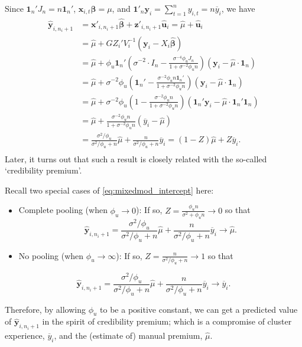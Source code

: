 \documentclass[ignorenonframetext,]{beamer}
\begin{document}
\begin{frame}[allowframebreaks]
\framebreak
Since $ \bm{1}_{n} ' J_n =n \bm{1}_n'$, $\mathbf{x}_{i,t}\bm{\beta}=\mu$, and $\bm{1}'_n \bm{y}_i = \sum_{t=1}^n y_{i,t}= n \overline{y}_i$, we have
$$
\begin{aligned}
\hat{\bm{y}}_{i,n_i+1} &= \bm{x}'_{i,n_i+1}\hat{\bm{\beta}} + \bm{z}'_{i,n_i+1}\hat{\bm{u}}_i =  \hat{\mu} + \hat{\bm{u}}_i \\
								 &= \hat{\mu} + G Z_i'V_i^{-1}(\bm{y}_i-X_i\hat{\bm{\beta}}) \\
								 &= \hat{\mu} + \phi_u  \bm{1}_{n} '\left( \sigma^{-2} \cdot I_n - \frac{\sigma^{-4}\phi_u J_n}{1 + \sigma^{-2}\phi_u  n} \right)(\bm{y}_i-\hat{\mu}\cdot \bm{1}_{n}) \\
								&= \hat{\mu} + \sigma^{-2}\phi_u   \left(\bm{1}_n' - \frac{\sigma^{-2}\phi_u n \bm{1}_n'}{1 + \sigma^{-2}\phi_u  n} \right)(\bm{y}_i-\hat{\mu}\cdot \bm{1}_{n}) \\
								&= \hat{\mu} + \sigma^{-2}\phi_u   \left(1 - \frac{\sigma^{-2}\phi_u n}{1 + \sigma^{-2}\phi_u  n} \right)(\bm{1}_n'\bm{y}_i-\hat{\mu}\cdot \bm{1}_n'\bm{1}_{n}) \\
								&= \hat{\mu} + \frac{\sigma^{-2}\phi_u n}{1 + \sigma^{-2}\phi_u  n} (\overline{y}_i-\hat{\mu}) \\
								&= \frac{\sigma^2/\phi_u}{\sigma^2/\phi_u+n}\hat{\mu} + \frac{n}{\sigma^2/\phi_u+n} \overline{y}_i = (1-Z) \hat{\mu} + Z \overline{y}_i.\\
\end{aligned}
$$
Later, it turns out that such a result is closely related with the so-called `credibility premium'.

\framebreak
Recall two special cases of \eqref{eq:mixedmod_intercept} here:
\begin{itemize}
	\item Complete pooling (when $\phi_u \rightarrow 0$): If so, $Z=\frac{\phi_u n}{\sigma^2+\phi_u n} \rightarrow  0$ so that 
$$
\hat{\bm{y}}_{i,n_i+1} = \frac{\sigma^2/\phi_u}{\sigma^2/\phi_u+n}\hat{\mu} + \frac{n}{\sigma^2/\phi_u+n} \overline{y}_i \rightarrow \hat{\mu}.
$$
	\item No pooling (when $\phi_u \rightarrow \infty$): If so, $Z=\frac{n}{\sigma^2/\phi_u+ n} \rightarrow  1$ so that
\end{itemize}
$$
\hat{\bm{y}}_{i,n_i+1} = \frac{\sigma^2/\phi_u}{\sigma^2/\phi_u+n}\hat{\mu} + \frac{n}{\sigma^2/\phi_u+n} \overline{y}_i \rightarrow  \overline{y}_i.
$$

Therefore, by allowing $\phi_u$ to be a positive constant, we can get a predicted value of $\hat{\bm{y}}_{i,n_i+1}$ in the spirit of credibility premium; which is a compromise of cluster experience, $\overline{y}_i$, and the (estimate of) manual premium, $\hat{\mu}$.


\end{frame}
\end{document}
